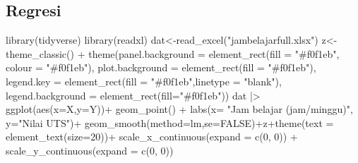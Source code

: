 \documentclass[
  letterpaper,
  DIV=11,
  numbers=noendperiod]{scrartcl}
\newenvironment{Shaded}{\begin{snugshade}}{\end{snugshade}}
\newcommand{\AttributeTok}[1]{\textcolor[rgb]{0.40,0.45,0.13}{#1}}
\newcommand{\ConstantTok}[1]{\textcolor[rgb]{0.56,0.35,0.01}{#1}}
\newcommand{\DecValTok}[1]{\textcolor[rgb]{0.68,0.00,0.00}{#1}}
\newcommand{\FunctionTok}[1]{\textcolor[rgb]{0.28,0.35,0.67}{#1}}
\newcommand{\NormalTok}[1]{\textcolor[rgb]{0.00,0.23,0.31}{#1}}
\newcommand{\OtherTok}[1]{\textcolor[rgb]{0.00,0.23,0.31}{#1}}
\newcommand{\SpecialCharTok}[1]{\textcolor[rgb]{0.37,0.37,0.37}{#1}}
\newcommand{\StringTok}[1]{\textcolor[rgb]{0.13,0.47,0.30}{#1}}
\begin{document}
\subsection{Regresi}\label{regresi-1}

\begin{Shaded}
\begin{Highlighting}[]
\FunctionTok{library}\NormalTok{(tidyverse)}
\FunctionTok{library}\NormalTok{(readxl)}
\NormalTok{dat}\OtherTok{\textless{}{-}}\FunctionTok{read\_excel}\NormalTok{(}\StringTok{"jambelajarfull.xlsx"}\NormalTok{)}
\NormalTok{z}\OtherTok{\textless{}{-}}\FunctionTok{theme\_classic}\NormalTok{() }\SpecialCharTok{+}
  \FunctionTok{theme}\NormalTok{(}\AttributeTok{panel.background =} \FunctionTok{element\_rect}\NormalTok{(}\AttributeTok{fill =} \StringTok{"\#f0f1eb"}\NormalTok{,}
                                        \AttributeTok{colour =} \StringTok{"\#f0f1eb"}\NormalTok{),}
        \AttributeTok{plot.background =} \FunctionTok{element\_rect}\NormalTok{(}\AttributeTok{fill =} \StringTok{"\#f0f1eb"}\NormalTok{),}
        \AttributeTok{legend.key =} \FunctionTok{element\_rect}\NormalTok{(}\AttributeTok{fill =} \StringTok{"\#f0f1eb"}\NormalTok{,}\AttributeTok{linetype =} \StringTok{"blank"}\NormalTok{),}
        \AttributeTok{legend.background =} \FunctionTok{element\_rect}\NormalTok{(}\AttributeTok{fill=}\StringTok{"\#f0f1eb"}\NormalTok{))}
\NormalTok{dat }\SpecialCharTok{|\textgreater{}} \FunctionTok{ggplot}\NormalTok{(}\FunctionTok{aes}\NormalTok{(}\AttributeTok{x=}\NormalTok{X,}\AttributeTok{y=}\NormalTok{Y))}\SpecialCharTok{+}
  \FunctionTok{geom\_point}\NormalTok{() }\SpecialCharTok{+}
  \FunctionTok{labs}\NormalTok{(}\AttributeTok{x=} \StringTok{"Jam belajar (jam/minggu)"}\NormalTok{, }\AttributeTok{y=}\StringTok{"Nilai UTS"}\NormalTok{)}\SpecialCharTok{+}
  \FunctionTok{geom\_smooth}\NormalTok{(}\AttributeTok{method=}\NormalTok{lm,}\AttributeTok{se=}\ConstantTok{FALSE}\NormalTok{)}\SpecialCharTok{+}\NormalTok{z}\SpecialCharTok{+}\FunctionTok{theme}\NormalTok{(}\AttributeTok{text =} \FunctionTok{element\_text}\NormalTok{(}\AttributeTok{size=}\DecValTok{20}\NormalTok{))}\SpecialCharTok{+}
  \FunctionTok{scale\_x\_continuous}\NormalTok{(}\AttributeTok{expand =} \FunctionTok{c}\NormalTok{(}\DecValTok{0}\NormalTok{, }\DecValTok{0}\NormalTok{)) }\SpecialCharTok{+} \FunctionTok{scale\_y\_continuous}\NormalTok{(}\AttributeTok{expand =} \FunctionTok{c}\NormalTok{(}\DecValTok{0}\NormalTok{, }\DecValTok{0}\NormalTok{))}
\end{Highlighting}
\end{Shaded}
\end{document}
